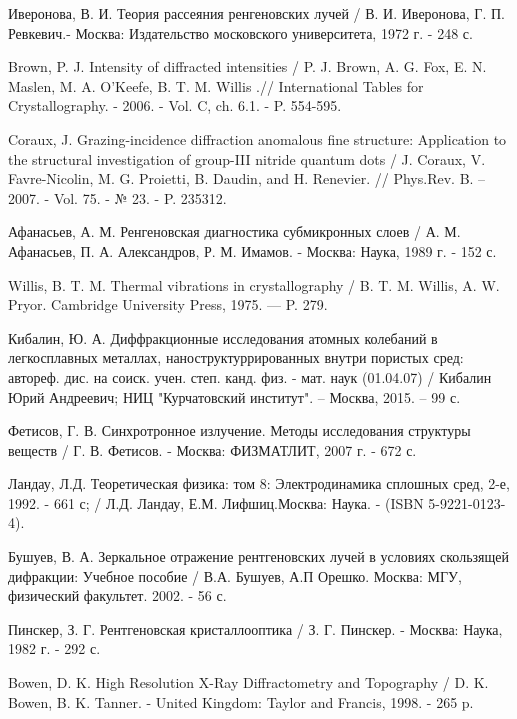 \begin{thebibliography}{99}
Иверонова, В. И. Теория рассеяния ренгеновских лучей / В. И. Иверонова, Г. П. Ревкевич.-
Москва: Издательство московского университета, 1972 г. - 248 с.

Brown, P. J. Intensity of diffracted intensities /
 P. J. Brown,  A. G. Fox, E. N. Maslen, M. A. O'Keefe, B. T. M. Willis .//
International Tables for Crystallography. - 2006. - Vol. C, ch. 6.1. - P. 554-595.

Coraux, J. Grazing-incidence diffraction anomalous fine structure: Application to
the structural investigation of group-III nitride quantum dots /
J. Coraux, V. Favre-Nicolin, M. G. Proietti, B. Daudin, and H. Renevier.
// Phys.Rev. B. – 2007. - Vol. 75. - № 23.  - P. 235312.

 Афанасьев, А. М. Ренгеновская диагностика субмикронных слоев /
А. М. Афанасьев, П. А. Александров, Р. М. Имамов.  - Москва: Наука, 1989 г. - 152 с.

Willis, B. T. M. Thermal vibrations in crystallography /
B. T. M. Willis, A. W. Pryor. Cambridge University Press, 1975. — P. 279.

Кибалин, Ю. А. Диффракционные исследования атомных колебаний в легкосплавных
металлах, наноструктуррированных внутри пористых сред: автореф. дис. на соиск.
учен. степ. канд. физ. - мат. наук (01.04.07) /
Кибалин Юрий Андреевич; НИЦ "Курчатовский институт". – Москва, 2015. – 99 с.

Фетисов, Г. В. Синхротронное излучение. Методы исследования структуры веществ /
 Г. В. Фетисов. - Москва: ФИЗМАТЛИТ, 2007 г. - 672 с.

Ландау, Л.Д. Теоретическая физика: том 8: Электродинамика сплошных сред, 2-е, 1992. - 661 с; /
Л.Д. Ландау, Е.М. Лифшиц.Москва: Наука. - (ISBN 5-9221-0123-4).

Бушуев, В. А. Зеркальное отражение рентгеновских лучей в условиях скользящей дифракции:
Учебное пособие / В.А. Бушуев, А.П Орешко. Москва: МГУ, физический факультет.  2002. - 56 с.

Пинскер, З. Г. Рентгеновская кристаллооптика / З. Г.  Пинскер.  - Москва: Наука,  1982 г. - 292 с.

Bowen, D. K. High Resolution X-Ray Diffractometry and Topography / D. K. Bowen, B. K. Tanner.
  - United Kingdom: Taylor and Francis, 1998. - 265 p.


\end{thebibliography}
